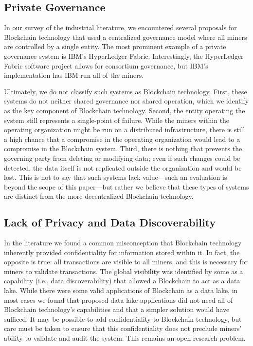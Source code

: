 \subsection{Private Governance}
\label{sec:private-blockchain}
In our survey of the industrial literature, we encountered several proposals for Blockchain technology that used a centralized governance model where all miners are controlled by a single entity.
The most prominent example of a private governance system is IBM's HyperLedger Fabric.
Interestingly, the HyperLedger Fabric software project allows for consortium governance, but IBM's implementation has IBM run all of the miners.

Ultimately, we do not classify such systems as Blockchain technology.
First, these systems do not neither shared governance nor shared operation, which we identify as the key component of Blockchain technology.
Second, the entity operating the system still represents a single-point of failure.
While the miners within the operating organization might be run on a distributed infrastructure, there is still a high chance that a compromise in the operating organization would lead to a compromise in the Blockchain system.
Third, there is nothing that prevents the governing party from deleting or modifying data; even if such changes could be detected, the data itself is not replicated outside the organization and would be lost.
This is not to say that such systems lack value---such an evaluation is beyond the scope of this paper---but rather we believe that these types of systems are distinct from the more decentralized Blockchain technology.

\subsection{Lack of Privacy and Data Discoverability}
In the literature we found a common misconception that Blockchain technology inherently provided confidentiality for information stored within it.
In fact, the opposite is true: all transactions are visible to all miners, and this is necessary for miners to validate transactions.
The global visibility was identified by some as a capability (i.e., data discoverability) that allowed a Blockchain to act as a data lake.
While there were some valid applications of Blockchain as a data lake, in most cases we found that proposed data lake applications did not need all of Blockchain technology's capabilities and that a simpler solution would have sufficed.
It may be possible to add confidentiality to Blockchain technology, but care must be taken to ensure that this confidentiality does not preclude miners' ability to validate and audit the system.
This remains an open research problem.

